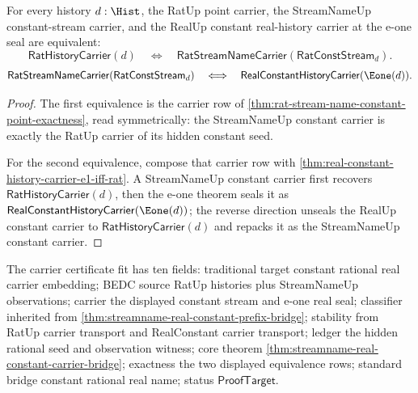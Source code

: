 \begin{theorem}
\label{thm:streamname-real-constant-carrier-bridge}
For every history $d:\Hist$, the RatUp point carrier, the StreamNameUp
constant-stream carrier, and the RealUp constant real-history carrier at the
e-one seal are equivalent:
$$
\mathsf{RatHistoryCarrier}(d)
\quad\Longleftrightarrow\quad
\mathsf{RatStreamNameCarrier}(\mathsf{RatConstStream}_d).
$$
$$
\mathsf{RatStreamNameCarrier}(\mathsf{RatConstStream}_d)
\quad\Longleftrightarrow\quad
\mathsf{RealConstantHistoryCarrier}(\Eone(d)).
$$
\end{theorem}
\begin{proof}
The first equivalence is the carrier row of
\autoref{thm:rat-stream-name-constant-point-exactness}, read symmetrically:
the StreamNameUp constant carrier is exactly the RatUp carrier of its hidden
constant seed.

For the second equivalence, compose that carrier row with
\autoref{thm:real-constant-history-carrier-e1-iff-rat}. A StreamNameUp
constant carrier first recovers $\mathsf{RatHistoryCarrier}(d)$, then the
e-one theorem seals it as
$\mathsf{RealConstantHistoryCarrier}(\Eone(d))$; the reverse direction unseals
the RealUp constant carrier to $\mathsf{RatHistoryCarrier}(d)$ and repacks it
as the StreamNameUp constant carrier.
\end{proof}

The carrier certificate fit has ten fields: traditional target constant
rational real carrier embedding; BEDC source RatUp histories plus StreamNameUp
observations; carrier the displayed constant stream and e-one real seal;
classifier inherited from \autoref{thm:streamname-real-constant-prefix-bridge};
stability from RatUp carrier transport and RealConstant carrier transport;
ledger the hidden rational seed and observation witness; core theorem
\autoref{thm:streamname-real-constant-carrier-bridge}; exactness the two
displayed equivalence rows; standard bridge constant rational real name; status
$\mathsf{ProofTarget}$.
